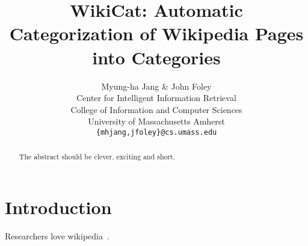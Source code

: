 \documentclass{article} %
\title{WikiCat: Automatic Categorization of Wikipedia Pages into Categories}
\author{Myung-ha Jang \& John Foley\\
  Center for Intelligent Information Retrieval\\
College of Information and Computer Sciences\\
University of Massachusetts Amherst\\
\texttt{\{mhjang,jfoley\}@cs.umass.edu}
}
\begin{document}
\maketitle

\begin{abstract}
The abstract should be clever, exciting and short.
\end{abstract}

\section{Introduction}
Researchers love wikipedia~\cite{wang2014concept,banerjee07,gabrilovich2007computing,meij2012adding,de2014taxonomic, pohl2012classifying}.


\small
\end{document}
